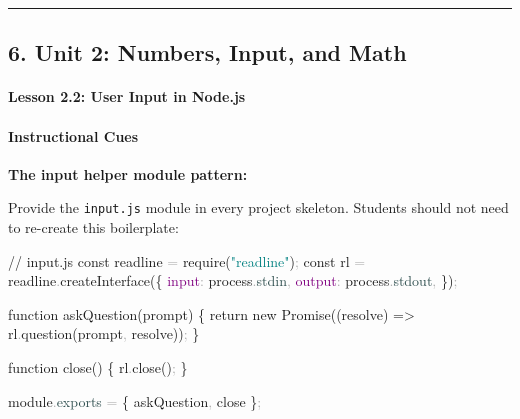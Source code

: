 \documentclass[
  justified,
  openright,
]{tufte-book}
\let\subsubsection\paragraph
\let\paragraph\paragraph
\newcommand{\AttributeTok}[1]{\textcolor{DarkSlateGray}{#1}}
\newcommand{\BuiltInTok}[1]{#1}
\newcommand{\CommentTok}[1]{\textcolor{MidGray}{#1}}
\newcommand{\ControlFlowTok}[1]{\textcolor{BrandBlue}{#1}}
\newcommand{\DataTypeTok}[1]{\textcolor{Purple}{#1}}
\newcommand{\FunctionTok}[1]{\textcolor{BrandBlue}{#1}}
\newcommand{\KeywordTok}[1]{\textcolor{BrandBlue}{#1}}
\newcommand{\NormalTok}[1]{#1}
\newcommand{\OperatorTok}[1]{\textcolor{DarkGray}{#1}}
\newcommand{\PreprocessorTok}[1]{\textcolor{BrandAccent}{#1}}
\newcommand{\StringTok}[1]{\textcolor{Teal}{#1}}
\newenvironment{Shaded}{%
  \begin{snugshade}
}{%
  \end{snugshade}
}
\let\subsubsection\paragraph
\let\paragraph\paragraph
\begin{document}
\begin{center}\rule{0.5\linewidth}{0.5pt}\end{center}

\subsection{6. Unit 2: Numbers, Input, and
Math}\label{unit-2-numbers-input-and-math}

\subsubsection{Lesson 2.2: User Input in
Node.js}\label{lesson-2.2-user-input-in-node.js}

\paragraph{Instructional Cues}\label{instructional-cues-2}

\textbf{The input helper module pattern:}

Provide the \texttt{input.js} module in every project skeleton. Students
should not need to re-create this boilerplate:

\begin{Shaded}
\begin{Highlighting}[]
\CommentTok{// input.js}
\KeywordTok{const}\NormalTok{ readline }\OperatorTok{=} \PreprocessorTok{require}\NormalTok{(}\StringTok{"readline"}\NormalTok{)}\OperatorTok{;}
\KeywordTok{const}\NormalTok{ rl }\OperatorTok{=}\NormalTok{ readline}\OperatorTok{.}\FunctionTok{createInterface}\NormalTok{(\{}
  \DataTypeTok{input}\OperatorTok{:} \BuiltInTok{process}\OperatorTok{.}\AttributeTok{stdin}\OperatorTok{,}
  \DataTypeTok{output}\OperatorTok{:} \BuiltInTok{process}\OperatorTok{.}\AttributeTok{stdout}\OperatorTok{,}
\NormalTok{\})}\OperatorTok{;}

\KeywordTok{function} \FunctionTok{askQuestion}\NormalTok{(prompt) \{}
  \ControlFlowTok{return} \KeywordTok{new} \BuiltInTok{Promise}\NormalTok{((resolve) }\KeywordTok{=\textgreater{}}\NormalTok{ rl}\OperatorTok{.}\FunctionTok{question}\NormalTok{(prompt}\OperatorTok{,}\NormalTok{ resolve))}\OperatorTok{;}
\NormalTok{\}}

\KeywordTok{function} \FunctionTok{close}\NormalTok{() \{}
\NormalTok{  rl}\OperatorTok{.}\FunctionTok{close}\NormalTok{()}\OperatorTok{;}
\NormalTok{\}}

\NormalTok{module}\OperatorTok{.}\AttributeTok{exports} \OperatorTok{=}\NormalTok{ \{ askQuestion}\OperatorTok{,}\NormalTok{ close \}}\OperatorTok{;}
\end{Highlighting}
\end{Shaded}
\end{document}
